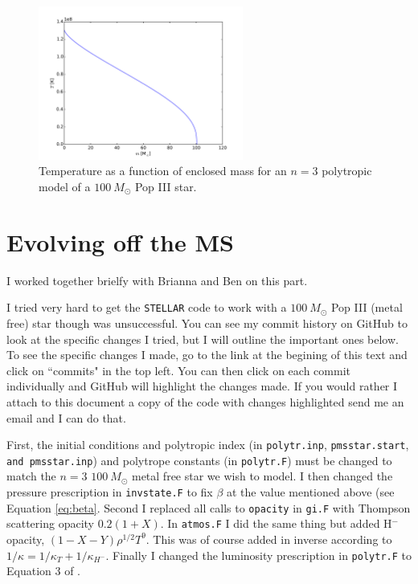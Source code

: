 \documentclass[12pt]{paper}
\begin{document}
\begin{figure}
\begin{center}
    \includegraphics[width=0.6\textwidth]{temperature3p0.pdf}
    \caption{Temperature as a function of enclosed mass for an $n=3$ polytropic model of a $100~M_\odot$ Pop III star.}
    \label{fig:tm}
\end{center}
\end{figure}

\section{Evolving off the MS}
I worked together brielfy with Brianna and Ben on this part. 

I tried very hard to get the \texttt{STELLAR} code to work with a $100~M_\odot$ Pop III (metal free) star though was unsuccessful. You can see my commit history on GitHub to look at the specific changes I tried, but I will outline the important ones below. To see the specific changes I made, go to the link at the begining of this text and click on ``commits" in the top left. You can then click on each commit individually and GitHub will highlight the changes made. If you would rather I attach to this document a copy of the code with changes highlighted send me an email and I can do that. 

First, the initial conditions and polytropic index (in \texttt{polytr.inp}, \texttt{pmsstar.start}, \texttt{and pmsstar.inp}) and polytrope constants (in \texttt{polytr.F}) must be changed to match the $n=3$ $100~M_\odot$ metal free star we wish to model. I then changed the pressure prescription in \texttt{invstate.F} to fix $\beta$ at the value mentioned above (see Equation \ref{eq:beta}. Second I replaced all calls to \texttt{opacity} in \texttt{gi.F} with Thompson scattering opacity $0.2(1+X)$. In \texttt{atmos.F} I did the same thing but added H$^-$ opacity, $(1-X-Y)\rho^{1/2}T^9$. This was of course added in inverse according to $1/\kappa=1/\kappa_T+1/\kappa_{H^-}$. Finally I changed the luminosity prescription in \texttt{polytr.F} to Equation 3 of \citet{BKL}. 
\end{document}
